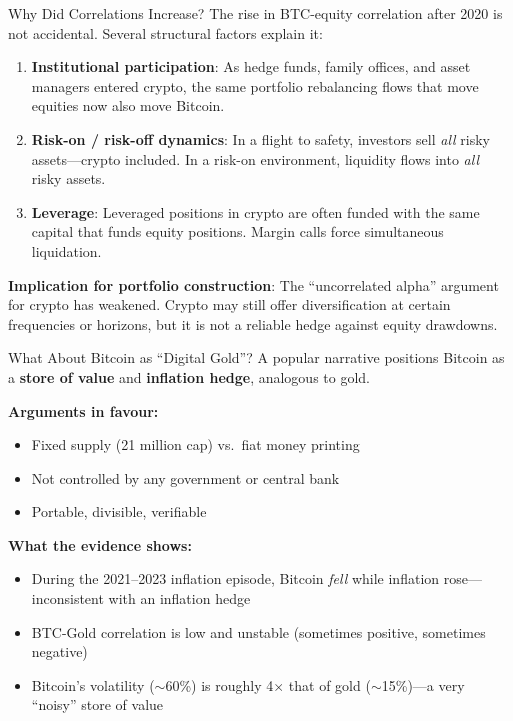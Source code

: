 \documentclass[10pt]{beamer}
\newcommand{\highlight}[1]{\textcolor{AccentOrange}{\textbf{#1}}}
\begin{document}
\begin{frame}{Why Did Correlations Increase?}
  The rise in BTC-equity correlation after 2020 is not accidental. Several structural factors explain it:
  
  \vspace{0.5em}
  \begin{enumerate}
    \item \textbf{Institutional participation}: As hedge funds, family offices, and asset managers entered crypto, the same portfolio rebalancing flows that move equities now also move Bitcoin.
        
    \vspace{0.3em}
    \item \textbf{Risk-on / risk-off dynamics}: In a flight to safety, investors sell \textit{all} risky assets---crypto included. In a risk-on environment, liquidity flows into \textit{all} risky assets.
    
    \vspace{0.3em}
    \item \textbf{Leverage}: Leveraged positions in crypto are often funded with the same capital that funds equity positions. Margin calls force simultaneous liquidation.
  \end{enumerate}
  
  \vspace{0.5em}
  \textbf{Implication for portfolio construction}: The ``uncorrelated alpha'' argument for crypto has weakened. Crypto may still offer diversification at certain frequencies or horizons, but it is not a reliable hedge against equity drawdowns.
\end{frame}

\begin{frame}{What About Bitcoin as ``Digital Gold''?}
  A popular narrative positions Bitcoin as a \highlight{store of value} and \highlight{inflation hedge}, analogous to gold.
  
  \vspace{0.5em}
  \textbf{Arguments in favour:}
  \begin{itemize}
    \item Fixed supply (21 million cap) vs.\ fiat money printing
    \item Not controlled by any government or central bank
    \item Portable, divisible, verifiable
  \end{itemize}
  
  \vspace{0.5em}
  \textbf{What the evidence shows:}
  \begin{itemize}
    \item During the 2021--2023 inflation episode, Bitcoin \textit{fell} while inflation rose---inconsistent with an inflation hedge
    \item BTC-Gold correlation is low and unstable (sometimes positive, sometimes negative)
    \item Bitcoin's volatility ($\sim$60\%) is roughly 4$\times$ that of gold ($\sim$15\%)---a very ``noisy'' store of value
  \end{itemize}
  
\end{frame}
\end{document}

